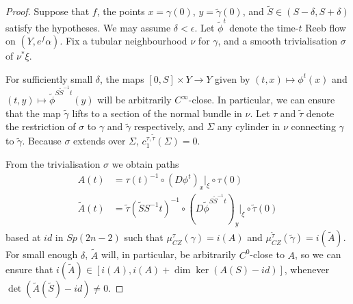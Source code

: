 \documentclass{article}
\numberwithin{equation}{section}
\numberwithin{figure}{section}
\begin{document}
\begin{proof}
    Suppose that $f$, the points $x=\gamma(0)$, $y=\tilde{\gamma}(0)$, and $\tilde{S}\in (S-\delta,S+\delta)$ satisfy the hypotheses. We may assume $\delta<\epsilon$.
    Let $\tilde{\phi}^t$ denote the time-$t$ Reeb flow on $(Y,e^f\alpha)$. Fix a tubular neighbourhood $\nu$ for $\gamma$, and a smooth trivialisation $\sigma$ of $\nu^*\xi$. 
    
    For sufficiently small $\delta$, the maps $[0,S]\times Y\rightarrow Y$ given by $(t,x)\mapsto \phi^t(x)$ and $(t,y)\mapsto \tilde{\phi}^{S\tilde{S}^{-1}t}(y)$ will be arbitrarily $C^\infty$-close. In particular, we can ensure that the map $\tilde{\gamma}$ lifts to a section of the normal bundle in $\nu$. Let $\tau$ and $\tilde{\tau}$ denote the restriction of $\sigma$ to $\gamma$ and $\tilde{\gamma}$ respectively, and $\Sigma$ any cylinder in $\nu$ connecting $\gamma$ to $\tilde{\gamma}$. Because $\sigma$ extends over $\Sigma$, $c_1^{\tau,\tilde{\tau}}(\Sigma)=0$. 
    
    From the trivialisation $\sigma$ we obtain paths
    \begin{equation}
    \begin{split}
    A(t)&=\tau(t)^{-1}\circ (D\phi^t)_x|_\xi\circ \tau(0)
    \\\tilde{A}(t)&=\tilde{\tau}(\tilde{S}S^{-1}t)^{-1}\circ (D\tilde{\phi}^{S\tilde{S}^{-1}t})_y|_\xi\circ \tilde{\tau}(0)
    \end{split}
    \end{equation}
    based at $id$ in $Sp(2n-2)$ such that $\mu_{CZ}^\tau(\gamma)=i(A)$ and $\mu_{CZ}^{\tilde{\tau}}(\tilde{\gamma})=i(\tilde{A})$. For small enough $\delta$, $\tilde{A}$ will, in particular, be arbitrarily $C^0$-close to $A$, so we can ensure that $i(\tilde{A})\in [i(A),i(A)+\dim\ker(A(S)-id)]$, whenever $\det(\tilde{A}(\tilde{S})-id)\neq 0$.
\end{proof}
\end{document}
